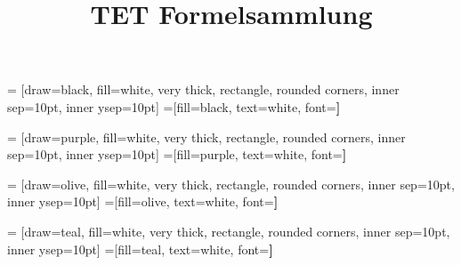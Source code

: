 \documentclass[fontsize=8pt]{scrartcl}
\title{TET Formelsammlung}
\begin{document}
 = [draw=black, fill=white, very thick,
    rectangle, rounded corners, inner sep=10pt, inner ysep=10pt]
 =[fill=black, text=white, font=\bfseries]

 = [draw=purple, fill=white, very thick,
    rectangle, rounded corners, inner sep=10pt, inner ysep=10pt]
 =[fill=purple, text=white, font=\bfseries]

 = [draw=olive, fill=white, very thick,
    rectangle, rounded corners, inner sep=10pt, inner ysep=10pt]
 =[fill=olive, text=white, font=\bfseries]

 = [draw=teal, fill=white, very thick,
    rectangle, rounded corners, inner sep=10pt, inner ysep=10pt]
 =[fill=teal, text=white, font=\bfseries]
\end{document}
